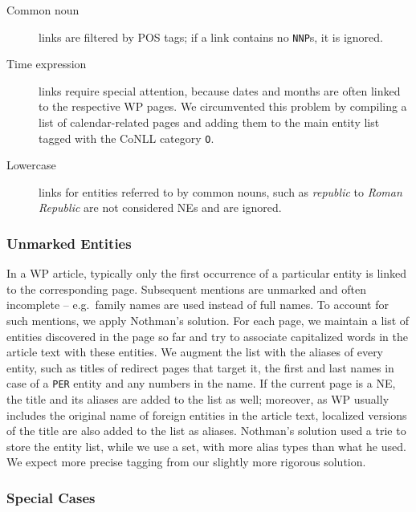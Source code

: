 \documentclass[11pt]{article}
\begin{document}
\begin{description}
\item[Common noun] links are filtered by POS tags; if a link contains no \texttt{NNP}s, it is ignored.
\item[Time expression] links require special attention, because dates and
  months are often linked to the respective WP pages. We circumvented this
  problem by compiling a list of calendar-related pages and adding them to the
  main entity list tagged with the CoNLL category \texttt{O}.
\item[Lowercase] links for entities referred to by common nouns, such as \textit{republic} to \textit{Roman Republic} are not considered NEs and are ignored.
\end{description}

\subsubsection{Unmarked Entities}

In a WP article, typically only the first occurrence of a particular entity is
linked to the corresponding page. Subsequent mentions are unmarked and often
incomplete -- e.g.~family names are used instead of full names. To account
for such mentions, we apply Nothman's  solution. For
each page, we maintain a list of entities discovered in the page so far and
try to associate capitalized words in the article text with these entities. We
augment the list with the aliases of every entity, such as titles of redirect
pages that target it, the first and last names in case of a \texttt{PER}
entity and any numbers in the name. If the current page is a NE, the
title and its aliases are added to the list as well; moreover, as WP usually
includes the original name of foreign entities in the article text, localized
versions of the title are also added to the list as aliases. Nothman's
solution used a trie to store the entity list, while we use a set, with more
alias types than what he used. We expect more precise tagging from our
slightly more rigorous solution.

\subsubsection{Special Cases}

\end{document}

